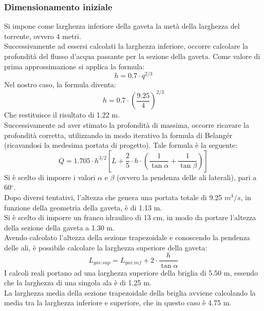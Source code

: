 \subsubsection{Dimensionamento iniziale}
Si impone come larghezza inferiore della gaveta la metà della larghezza del torrente, ovvero 4 metri.\\
Successivamente ad essersi calcolati la larghezza inferiore, occorre calcolare la profondità del flusso d'acqua passante per la sezione della gaveta. Come valore di prima approssimazione si applica la formula:
\begin{equation}
    h = 0.7 \cdot q ^{2/3}
\end{equation}
Nel nostro caso, la formula diventa:
\begin{equation}
    h = 0.7 \cdot \left( \frac{9.25}{4} \right)^{2/3}
\end{equation}
Che restituisce il risultato di 1.22 m.\\
Successivamente ad aver stimato la profondità di massima, occorre ricavare la profondità corretta, utilizzando in modo iterativo la formula di Belangér (ricavandosi la medesima portata di progetto). Tale formula è la seguente:
\begin{equation}
Q = 1.705 \cdot h^{3/2} \left[L + \frac{2}{5}\cdot h \cdot \left(\frac{1}{\tan{\alpha}} + \frac{1}{\tan{\beta}}\right) \right]
\end{equation}
Si è scelto di imporre i valori $\alpha$ e $\beta$ (ovvero la pendenza delle ali laterali), pari a 60$^\circ$.\\
Dopo diversi tentativi, l'altezza che genera una portata totale di 9.25 $m^3/s$, in funzione della geometria della gaveta, è di 1.13 m.\\
Si è scelto di imporre un franco idraulico di 13 cm, in modo da portare l'altezza della sezione della gaveta a 1.30 m.\\
Avendo calcolato l'altezza della sezione trapezoidale e conoscendo la pendenza delle ali, è possibile calcolare la larghezza superiore della gaveta:
\begin{equation}
    L_{gav.sup} = L_{gav.inf} + 2 \cdot \frac{h}{\tan \alpha} 
\end{equation}
I calcoli reali portano ad una larghezza superiore della briglia di 5.50 m, essendo che la larghezza di una singola ala è di 1.25 m.\\
La larghezza media della sezione trapezoidale della briglia avviene calcolando la media tra la larghezza inferiore e superiore, che in questo caso è 4.75 m.\\
